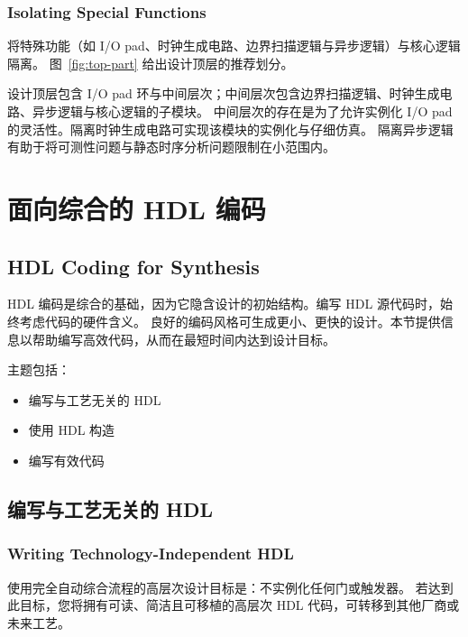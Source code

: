 \subsubsection*{Isolating Special Functions}

将特殊功能（如 I/O pad、时钟生成电路、边界扫描逻辑与异步逻辑）与核心逻辑隔离。
图~\ref{fig:top-part} 给出设计顶层的推荐划分。


设计顶层包含 I/O pad 环与中间层次；中间层次包含边界扫描逻辑、时钟生成电路、异步逻辑与核心逻辑的子模块。
中间层次的存在是为了允许实例化 I/O pad 的灵活性。隔离时钟生成电路可实现该模块的实例化与仔细仿真。
隔离异步逻辑有助于将可测性问题与静态时序分析问题限制在小范围内。

\section{面向综合的 HDL 编码}
\subsection*{HDL Coding for Synthesis}

HDL 编码是综合的基础，因为它隐含设计的初始结构。编写 HDL 源代码时，始终考虑代码的硬件含义。
良好的编码风格可生成更小、更快的设计。本节提供信息以帮助编写高效代码，从而在最短时间内达到设计目标。

主题包括：
\begin{itemize}
  \item 编写与工艺无关的 HDL
  \item 使用 HDL 构造
  \item 编写有效代码
\end{itemize}

\subsection{编写与工艺无关的 HDL}
\subsubsection*{Writing Technology-Independent HDL}

使用完全自动综合流程的高层次设计目标是：不实例化任何门或触发器。
若达到此目标，您将拥有可读、简洁且可移植的高层次 HDL 代码，可转移到其他厂商或未来工艺。

